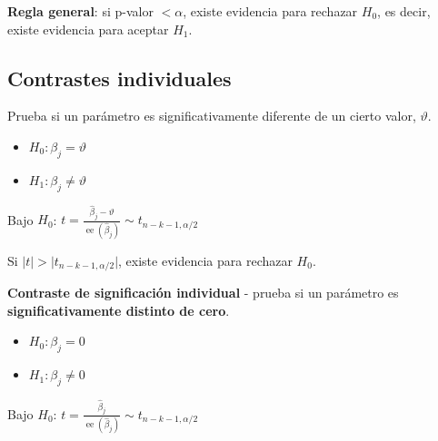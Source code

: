 \documentclass[10pt, a4paper, landscape]{article}
\DeclareMathOperator{\se}{ee}
\begin{document}
\begin{multicols}{3}
\begin{multicols}{2}
\columnbreak


\end{multicols}

\textbf{Regla general}: si p-valor \( < \alpha \), existe evidencia para rechazar \( H_{0} \), es decir, existe evidencia para aceptar \( H_{1} \).

\columnbreak

\subsection*{Contrastes individuales}

Prueba si un parámetro es significativamente diferente de un cierto valor, \( \vartheta \).

\begin{itemize}[leftmargin=*]
	\item \( H_{0}: \beta_{j} = \vartheta \)
	\item \( H_{1}: \beta_{j} \neq \vartheta \)
\end{itemize}

\begin{center}
	Bajo \( H_{0} \): \quad \( t = \frac{\hat{\beta}_{j} - \vartheta}{\se(\hat{\beta}_{j})} \sim t_{n - k - 1, \alpha / 2} \)
\end{center}

Si \( \lvert t \rvert > \lvert t_{n - k - 1, \alpha / 2} \rvert \), existe evidencia para rechazar \( H_{0} \).

\textbf{Contraste de significación individual} - prueba si un parámetro es \textbf{significativamente distinto de cero}.

\begin{itemize}[leftmargin=*]
	\item \( H_{0}: \beta_{j} = 0 \)
	\item \( H_{1}: \beta_{j} \neq 0 \)
\end{itemize}

\begin{center}
	Bajo \( H_{0} \): \quad \( t = \frac{\hat{\beta}_{j}}{\se(\hat{\beta}_{j})} \sim t_{n - k - 1, \alpha / 2} \)
\end{center}


\end{multicols}
\end{document}

